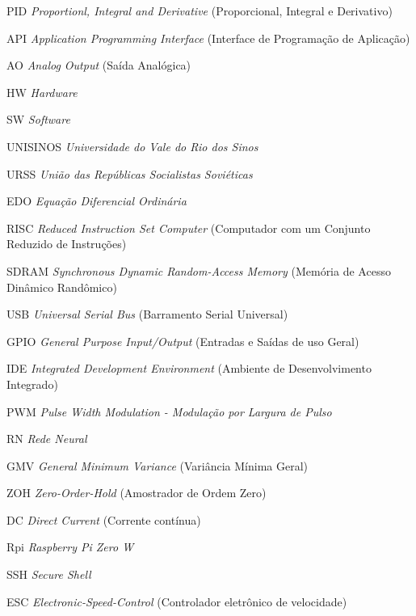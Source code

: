 \listoffigures*
\cleardoublepage
\listoftables*
\cleardoublepage
\begin{siglas}
\item[PID] \textit{Proportionl, Integral and Derivative} (Proporcional, Integral e Derivativo)
\item[API] \textit{Application Programming Interface} (Interface de Programação de Aplicação)
\item[AO] \textit{Analog Output} (Saída Analógica)
\item[HW]  \textit{Hardware}
\item[SW]  \textit{Software}
\item[UNISINOS]  \textit{Universidade do Vale do Rio dos Sinos}
\item[URSS]  \textit{União das Repúblicas Socialistas Soviéticas}
\item[EDO]  \textit{Equação Diferencial Ordinária}
\item[RISC]  \textit{Reduced Instruction Set Computer} (Computador com um Conjunto Reduzido de Instruções)
\item[SDRAM]  \textit{Synchronous Dynamic Random-Access Memory} (Memória de Acesso Dinâmico Randômico)
\item[USB]   \textit{Universal Serial Bus}  (Barramento Serial Universal)
\item[GPIO]  \textit{General Purpose Input/Output} (Entradas e Saídas de uso Geral)
\item[IDE]  \textit{Integrated Development Environment} (Ambiente de Desenvolvimento Integrado)
\item[PWM]  \textit{Pulse Width Modulation - Modulação por Largura de Pulso}
\item[RN]  \textit{Rede Neural}
\item[GMV]  \textit{General Minimum Variance} (Variância Mínima Geral)
\item[ZOH]  \textit{Zero-Order-Hold} (Amostrador de Ordem Zero)
\item[DC]  \textit{Direct Current} (Corrente contínua)
\item[Rpi]  \textit{Raspberry Pi Zero W}
\item[SSH]  \textit{Secure Shell}
\item[ESC]  \textit{Electronic-Speed-Control} (Controlador eletrônico de 
velocidade)
\end{siglas}

